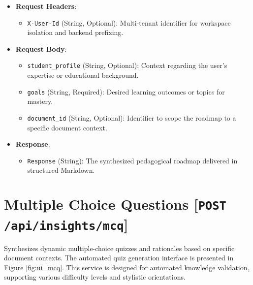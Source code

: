 \begin{itemize}
    \item \textbf{Request Headers}:
    \begin{itemize}
        \item \texttt{X-User-Id} (String, Optional): Multi-tenant identifier for workspace isolation and backend prefixing.
    \end{itemize}
    \item \textbf{Request Body}:
    \begin{itemize}
        \item \texttt{student\_profile} (String, Optional): Context regarding the user's expertise or educational background.
        \item \texttt{goals} (String, Required): Desired learning outcomes or topics for mastery.
        \item \texttt{document\_id} (String, Optional): Identifier to scope the roadmap to a specific document context.
    \end{itemize}
    \item \textbf{Response}:
    \begin{itemize}
        \item \texttt{Response} (String): The synthesized pedagogical roadmap delivered in structured Markdown.
    \end{itemize}
\end{itemize}

\section*{Multiple Choice Questions [\texttt{POST} \texttt{/api/insights/mcq}]}
Synthesizes dynamic multiple-choice quizzes and rationales based on specific document contexts. The automated quiz generation interface is presented in Figure \ref{fig:ui_mcq}. This service is designed for automated knowledge validation, supporting various difficulty levels and stylistic orientations.

